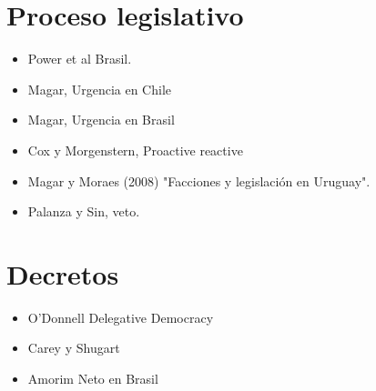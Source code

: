 \documentclass{article}
\begin{document}
\section{Proceso legislativo}
\label{sec:orgadd3ba7}
\begin{itemize}
\item Power et al Brasil.
\item Magar, Urgencia en Chile
\item Magar, Urgencia en Brasil
\item Cox y Morgenstern, Proactive reactive
\item Magar y Moraes (2008) "Facciones y legislación en Uruguay".
\item Palanza y Sin, veto.
\end{itemize}

\section{Decretos}
\label{sec:orgf4e3289}
\begin{itemize}
\item O'Donnell Delegative Democracy
\item Carey y Shugart
\item Amorim Neto en Brasil
\end{itemize}
\end{document}
